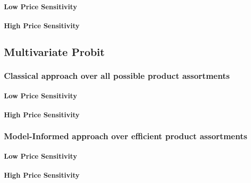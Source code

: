 \paragraph{Low Price Sensitivity}



\paragraph{High Price Sensitivity}



\subsection{Multivariate Probit}

\subsubsection{Classical approach over all possible product assortments}

\paragraph{Low Price Sensitivity}



\paragraph{High Price Sensitivity}



\subsubsection{Model-Informed approach over efficient product assortments}

\paragraph{Low Price Sensitivity}



\paragraph{High Price Sensitivity}

